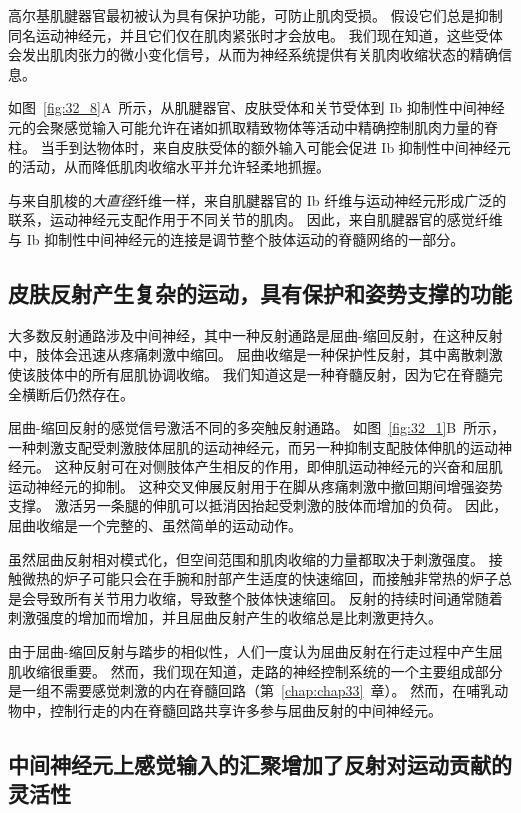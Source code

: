 高尔基肌腱器官最初被认为具有保护功能，可防止肌肉受损。
假设它们总是抑制同名运动神经元，并且它们仅在肌肉紧张时才会放电。
我们现在知道，这些受体会发出肌肉张力的微小变化信号，从而为神经系统提供有关肌肉收缩状态的精确信息。


如图~\ref{fig:32_8}A~所示，从肌腱器官、皮肤受体和关节受体到 Ib 抑制性中间神经元的会聚感觉输入可能允许在诸如抓取精致物体等活动中精确控制肌肉力量的脊柱。
当手到达物体时，来自皮肤受体的额外输入可能会促进 Ib 抑制性中间神经元的活动，从而降低肌肉收缩水平并允许轻柔地抓握。


与来自肌梭的\textit{大直径}纤维一样，来自肌腱器官的 Ib 纤维与运动神经元形成广泛的联系，运动神经元支配作用于不同关节的肌肉。
因此，来自肌腱器官的感觉纤维与 Ib 抑制性中间神经元的连接是调节整个肢体运动的脊髓网络的一部分。



\subsection{皮肤反射产生复杂的运动，具有保护和姿势支撑的功能}

大多数反射通路涉及中间神经，其中一种反射通路是屈曲-缩回反射，在这种反射中，肢体会迅速从疼痛刺激中缩回。
屈曲收缩是一种保护性反射，其中离散刺激使该肢体中的所有屈肌协调收缩。
我们知道这是一种脊髓反射，因为它在脊髓完全横断后仍然存在。


屈曲-缩回反射的感觉信号激活不同的多突触反射通路。 
如图~\ref{fig:32_1}B~所示，一种刺激支配受刺激肢体屈肌的运动神经元，而另一种抑制支配肢体伸肌的运动神经元。
这种反射可在对侧肢体产生相反的作用，即伸肌运动神经元的兴奋和屈肌运动神经元的抑制。
这种交叉伸展反射用于在脚从疼痛刺激中撤回期间增强姿势支撑。
激活另一条腿的伸肌可以抵消因抬起受刺激的肢体而增加的负荷。
因此，屈曲收缩是一个完整的、虽然简单的运动动作。


虽然屈曲反射相对模式化，但空间范围和肌肉收缩的力量都取决于刺激强度。
接触微热的炉子可能只会在手腕和肘部产生适度的快速缩回，而接触非常热的炉子总是会导致所有关节用力收缩，导致整个肢体快速缩回。
反射的持续时间通常随着刺激强度的增加而增加，并且屈曲反射产生的收缩总是比刺激更持久。


由于屈曲-缩回反射与踏步的相似性，人们一度认为屈曲反射在行走过程中产生屈肌收缩很重要。
然而，我们现在知道，走路的神经控制系统的一个主要组成部分是一组不需要感觉刺激的内在脊髓回路（第~\ref{chap:chap33}~章）。
然而，在哺乳动物中，控制行走的内在脊髓回路共享许多参与屈曲反射的中间神经元。



\subsection{中间神经元上感觉输入的汇聚增加了反射对运动贡献的灵活性}

